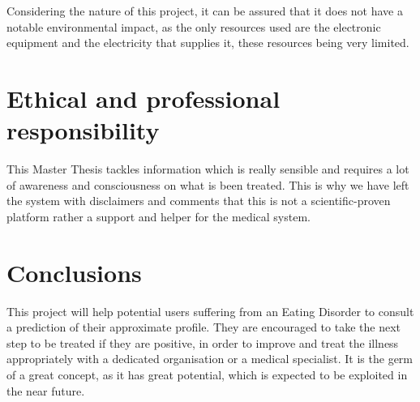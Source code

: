 Considering the nature of this project, it can be assured that it does not have a notable environmental impact, as the only resources used are the electronic equipment and the electricity that supplies it, these resources being very limited.

\section*{Ethical and professional responsibility}

This Master Thesis tackles information which is really sensible and requires a lot of awareness and consciousness on what is been treated. This is why we have left the system with disclaimers and comments that this is not a scientific-proven platform rather a support and helper for the medical system.

\section*{Conclusions}

This project will help potential users suffering from an Eating Disorder to consult a prediction of their approximate profile. They are encouraged to take the next step to be treated if they are positive, in order to improve and treat the illness appropriately with a dedicated organisation or a medical specialist. It is the germ of a great concept, as it has great potential, which is expected to be exploited in the near future.
